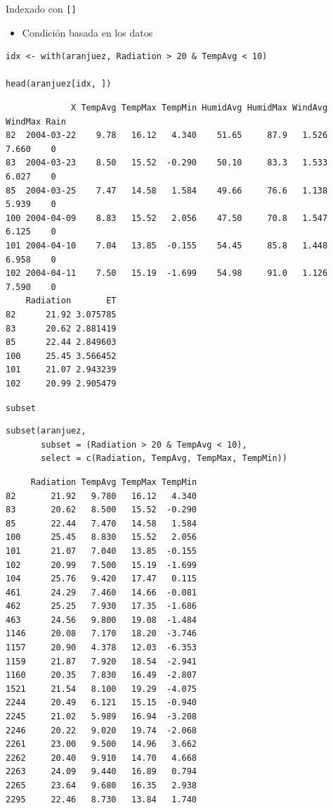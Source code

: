 \documentclass[xcolor={usenames,svgnames,dvipsnames}]{beamer}
\begin{document}
\begin{frame}[fragile,label=sec-5-2-2]{Indexado con \texttt{[]}}
 \begin{itemize}
\item Condición basada en los datos
\end{itemize}
\lstset{language=R,label= ,caption= ,numbers=none}
\begin{lstlisting}
idx <- with(aranjuez, Radiation > 20 & TempAvg < 10) 

head(aranjuez[idx, ])
\end{lstlisting}

\begin{verbatim}
             X TempAvg TempMax TempMin HumidAvg HumidMax WindAvg WindMax Rain
82  2004-03-22    9.78   16.12   4.340    51.65     87.9   1.526   7.660    0
83  2004-03-23    8.50   15.52  -0.290    50.10     83.3   1.533   6.027    0
85  2004-03-25    7.47   14.58   1.584    49.66     76.6   1.138   5.939    0
100 2004-04-09    8.83   15.52   2.056    47.50     70.8   1.547   6.125    0
101 2004-04-10    7.04   13.85  -0.155    54.45     85.8   1.448   6.958    0
102 2004-04-11    7.50   15.19  -1.699    54.98     91.0   1.126   7.590    0
    Radiation       ET
82      21.92 3.075785
83      20.62 2.881419
85      22.44 2.849603
100     25.45 3.566452
101     21.07 2.943239
102     20.99 2.905479
\end{verbatim}
\end{frame}

\begin{frame}[fragile,label=sec-5-2-3]{\texttt{subset}}
 \lstset{language=R,label= ,caption= ,numbers=none}
\begin{lstlisting}
subset(aranjuez,
       subset = (Radiation > 20 & TempAvg < 10),
       select = c(Radiation, TempAvg, TempMax, TempMin))
\end{lstlisting}

\begin{verbatim}
     Radiation TempAvg TempMax TempMin
82       21.92   9.780   16.12   4.340
83       20.62   8.500   15.52  -0.290
85       22.44   7.470   14.58   1.584
100      25.45   8.830   15.52   2.056
101      21.07   7.040   13.85  -0.155
102      20.99   7.500   15.19  -1.699
104      25.76   9.420   17.47   0.115
461      24.29   7.460   14.66  -0.081
462      25.25   7.930   17.35  -1.686
463      24.56   9.800   19.08  -1.484
1146     20.08   7.170   18.20  -3.746
1157     20.90   4.378   12.03  -6.353
1159     21.87   7.920   18.54  -2.941
1160     20.35   7.830   16.49  -2.807
1521     21.54   8.100   19.29  -4.075
2244     20.49   6.121   15.15  -0.940
2245     21.02   5.989   16.94  -3.208
2246     20.22   9.020   19.74  -2.068
2261     23.00   9.500   14.96   3.662
2262     20.40   9.910   14.70   4.668
2263     24.09   9.440   16.89   0.794
2265     23.64   9.680   16.35   2.938
2295     22.46   8.730   13.84   1.740
\end{verbatim}
\end{frame}
\end{document}
